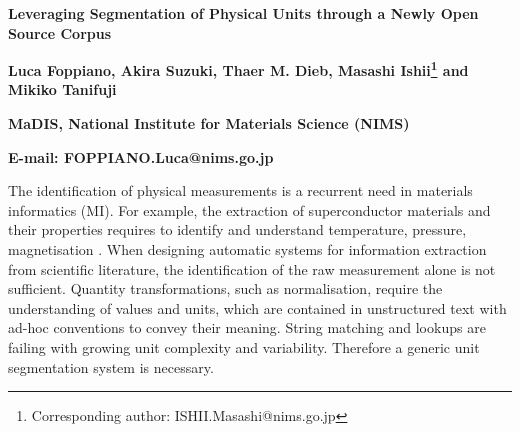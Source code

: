 \documentclass[a4,11pt]{article}
\begin{document}
\renewcommand{\baselinestretch}{1.12}\small\normalsize

\begin{center}
  
  \textbf{\large Leveraging Segmentation of Physical Units through a Newly Open Source Corpus}
  
  \textbf{Luca Foppiano, Akira Suzuki, Thaer M. Dieb, Masashi Ishii\footnote{Corresponding author: ISHII.Masashi@nims.go.jp} and Mikiko Tanifuji}
  
  \textbf{MaDIS, National Institute for Materials Science (NIMS)}
  
   \textbf{E-mail: FOPPIANO.Luca@nims.go.jp}
\end{center}


The identification of physical measurements is a recurrent need in materials informatics (MI). For example, the extraction of superconductor materials and their properties requires to identify and understand temperature, pressure, magnetisation \autocite{foppiano2019proposal}.
When designing automatic systems for information extraction from scientific literature, the identification of the raw measurement alone is not sufficient. Quantity transformations, such as normalisation, require the understanding of values and units, which are contained in unstructured text with ad-hoc conventions to convey their meaning. 
String matching and lookups are failing with growing unit complexity and variability. Therefore a generic unit segmentation system is necessary.
\end{document}
